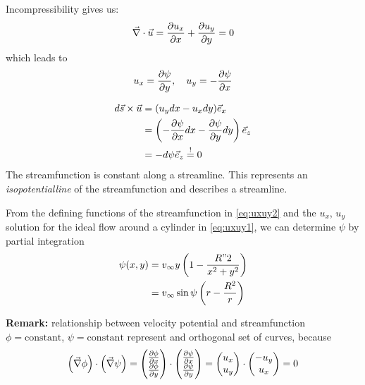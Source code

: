 Incompressibility gives us:
\begin{equation}
 \vec{\nabla}\cdot\vec{u} = \frac{\partial u_x}{\partial x}+\frac{\partial u_y}{\partial y}=0
\end{equation}
which leads to
\begin{equation}
 u_x = \frac{\partial \psi}{\partial y}, \quad u_y = -\frac{\partial \psi}{\partial x} \label{eq:uxuy2}
\end{equation}

\begin{align}
d\vec{s}\times\vec{u} &= (u_ydx-u_xdy)\vec{e}_x \\
&= \left(-\frac{\partial \psi}{\partial x}dx-\frac{\partial \psi}{\partial y}dy\right)\vec{e}_z\\
&= -d\psi \vec{e}_z \overset{!}{=} 0
\end{align}
The streamfunction is constant along a streamline. This represents an \emph{isopotentialline} of the streamfunction and describes a streamline.

From the defining functions of the streamfunction in \eqref{eq:uxuy2} and the $u_x$, $u_y$ solution for the ideal flow around a cylinder in \eqref{eq:uxuy1}, we can determine $\psi$ by partial integration
\begin{align}
\psi(x,y) &= v_\infty y\left(1-\frac{R"2}{x^2+y^2}\right)\\
&= v_\infty \sin\psi\left(r-\frac{R^2}{r}\right)
\end{align}

\begin{framed}
\textbf{Remark:} relationship between velocity potential and streamfunction $\phi=\mathrm{constant}$, $\psi=\mathrm{constant}$ represent and orthogonal set of curves, because
\begin{equation}
\left(\vec{\nabla}\phi\right)\cdot\left(\vec{\nabla}\psi\right) = 
\begin{pmatrix}
\frac{\partial \phi}{\partial x} \\ \frac{\partial \phi}{\partial y}
\end{pmatrix} \cdot
\begin{pmatrix}
\frac{\partial \psi}{\partial x} \\ \frac{\partial \psi}{\partial y}
\end{pmatrix} = 
\begin{pmatrix}
u_x \\ u_y
\end{pmatrix}\cdot
\begin{pmatrix}
-u_y \\ u_x
\end{pmatrix} = 0
\end{equation}
\end{framed}


